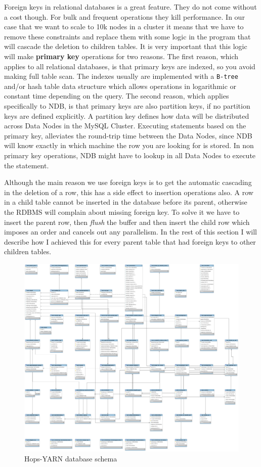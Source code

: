 Foreign keys in relational databases is a great feature. They do not
come without a cost though. For bulk and frequent operations they kill
performance. In our case that we want to scale to 10k nodes in a
cluster it means that we have to remove these constraints and replace
them with some logic in the program that will cascade the deletion to
children tables. It is very important that this logic will make
\textbf{primary key} operations for two reasons. The first reason, which
applies to all relational databases, is that primary keys are indexed,
so you avoid making full table scan. The indexes usually are
implemented with a \texttt{B-tree} and/or hash table data structure which allows
operations in logarithmic or constant time depending on the query. The second reason, which applies
specifically to NDB, is that primary keys are also partition keys, if
no partition keys are defined explicitly. A
partition key defines how data will be distributed across Data Nodes
in the MySQL Cluster. Executing statements based on the primary key,
alleviates the round-trip time between the Data Nodes, since NDB will
know exactly in which machine the row you are looking for is
stored. In non primary key operations, NDB might have to lookup in all
Data Nodes to execute the statement.

Although the main reason we use foreign keys is to get the
automatic cascading in the deletion of a row, this has a side effect to
insertion operations also. A row in a child table cannot be inserted
in the database before its parent, otherwise the RDBMS will complain
about missing foreign key. To solve it we have to insert the parent
row, then \emph{flush} the buffer and then insert the child row which
imposes an order and cancels out any parallelism. In the rest of this section I will describe how I achieved
this for every parent table that had foreign keys to other children tables.

\begin{figure}
\centering
\includegraphics[scale=0.2,angle=90]{resources/images/Implementation/hops_yarn_ndb_schema_full.png}
\caption{Hops-YARN database schema}
\label{fig:impl_fk_yarn_schema}
\end{figure}

